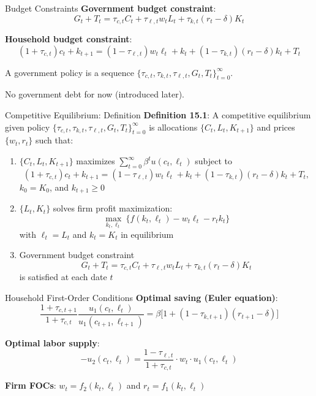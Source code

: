 \documentclass[blue]{beamer}
\begin{document}
\begin{frame}{Budget Constraints}
\textbf{Government budget constraint}:
\[
G_t + T_t = \tau_{c,t} C_t + \tau_{\ell,t} w_t L_t + \tau_{k,t}(r_t - \delta) K_t
\]

\textbf{Household budget constraint}:
\[
(1+\tau_{c,t}) c_t + k_{t+1} = (1-\tau_{\ell,t}) w_t \ell_t + k_t + (1-\tau_{k,t})(r_t - \delta) k_t + T_t
\]

	
	\bigskip
	A government policy is a sequence $\{\tau_{c,t}, \tau_{k,t}, \tau_{\ell,t}, G_t, T_t\}_{t=0}^\infty$.
	
	\bigskip
	No government debt for now (introduced later).
\end{frame}

\begin{frame}{Competitive Equilibrium: Definition}
	\textbf{Definition 15.1}: A competitive equilibrium given policy $\{\tau_{c,t}, \tau_{k,t}, \tau_{\ell,t}, G_t, T_t\}_{t=0}^\infty$ is allocations $\{C_t, L_t, K_{t+1}\}$ and prices $\{w_t, r_t\}$ such that:
	
	\bigskip
	\begin{enumerate}
		\item[(i)] $\{C_t, L_t, K_{t+1}\}$ maximizes $\sum_{t=0}^\infty \beta^t u(c_t, \ell_t)$ subject to 	
		\[
		(1+\tau_{c,t})c_t + k_{t+1} = (1-\tau_{\ell,t}) w_t\ell_t + k_t + (1-\tau_{k,t})(r_t - \delta) k_t + T_t,
		\] 
		$k_0 = K_0$, and $k_{t+1} \geq 0$
		\item[(ii)] $\{L_t, K_t\}$ solves firm profit maximization:
		\[
		\max_{k_t, \ell_t}\ \{f(k_t, \ell_t) - w_t \ell_t - r_t k_t\}
		\]
		with $\ell_t = L_t$ and $k_t = K_t$ in equilibrium
		\item[(iii)] Government budget constraint 
		\[
		G_t + T_t = \tau_{c,t} C_t + \tau_{\ell,t} w_t L_t + \tau_{k,t}(r_t - \delta) K_t
		\]
		is satisfied at each date $t$
	\end{enumerate}
\end{frame}

\begin{frame}{Household First-Order Conditions}
	\textbf{Optimal saving (Euler equation)}:
	\[
	\frac{1+\tau_{c,t+1}}{1+\tau_{c,t}} \frac{u_1(c_t, \ell_t)}{u_1(c_{t+1}, \ell_{t+1})} = \beta\bigl[1 + (1-\tau_{k,t+1})(r_{t+1} - \delta)\bigr]
	\]
	
	\textbf{Optimal labor supply}:
	\[
	-u_2(c_t, \ell_t) = \frac{1-\tau_{\ell,t}}{1+\tau_{c,t}} \cdot w_t \cdot u_1(c_t, \ell_t)
	\]
	
	\textbf{Firm FOCs}: $w_t = f_2(k_t, \ell_t)$ and $r_t = f_1(k_t, \ell_t)$
\end{frame}
\end{document}
